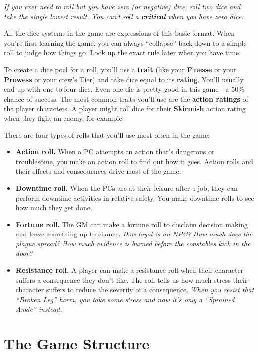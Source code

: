 \documentclass[11pt,oneside]{book}
\newcommand{\gameterm}[1]{\textbf{#1}}
\begin{document}
\emph{If you ever need to roll but you have zero (or negative) dice, roll two dice and take the single lowest result. You can’t roll a \textbf{critical} when you have zero dice.}

All the dice systems in the game are expressions of this basic format. When you’re first learning the game, you can always “collapse” back down to a simple roll to judge how things go. Look up the exact rule later when you have time.

To create a dice pool for a roll, you’ll use a \textbf{trait} (like your \gameterm{Finesse}  or your \gameterm{Prowess}  or your crew’s Tier) and take dice equal to its \textbf{rating}. You’ll usually end up with one to four dice. Even one die is pretty good in this game---a 50\% chance of success. The most common traits you’ll use are the \textbf{action ratings} of the player characters. A player might roll dice for their \gameterm{Skirmish}  action rating when they fight an enemy, for example.

There are four types of rolls that you’ll use most often in the game:

\begin{itemize}
	\item \gameterm{Action roll. } When a PC attempts an action that’s dangerous or troublesome, you make an action roll to find out how it goes. Action rolls and their effects and consequences drive most of the game.
	\item \gameterm{Downtime roll. } When the PCs are at their leisure after a job, they can perform downtime activities in relative safety. You make downtime rolls to see how much they get done.
	\item \gameterm{Fortune roll. } The GM can make a fortune roll to disclaim decision making and leave something up to chance. \emph{How loyal is an NPC? How much does the plague spread? How much evidence is burned before the constables kick in the door?}
	\item \gameterm{Resistance roll. } A player can make a resistance roll when their character suffers a consequence they don’t like. The roll tells us how much stress their character suffers to reduce the severity of a consequence. \emph{When you resist that “Broken Leg” harm, you take some stress and now it’s only a “Sprained Ankle” instead.}
\end{itemize}

\section{The Game Structure}
\end{document}

